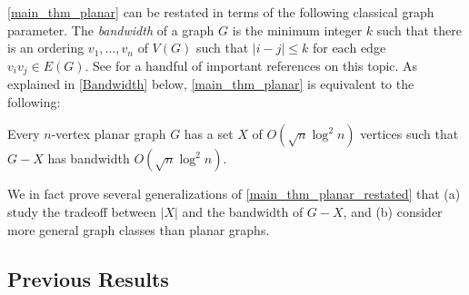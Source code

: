 \documentclass{patmorin}
\renewcommand{\leq}{\leqslant}
\newcommand{\pat}[1]{\textcolor{Blue}{Pat: #1}}
\newcommand{\gwen}[1]{\textcolor{Purple}{Gwen: #1}}
\newcommand{\defin}[1]{\emph{\textcolor{brightmaroon}{#1}}}
\begin{document}


\cref{main_thm_planar} can be restated in terms of the following classical graph parameter. The \defin{bandwidth} of a graph $G$ is the minimum integer $k$ such that there is an ordering $v_1,\dots,v_n$ of $V(G)$ such that $|i-j|\leq k$ for each edge $v_iv_j\in E(G)$. See \citep{CS89,ST20,ABET20,BPTW10,rao:small,BST09,feige:approximating} for a handful of important references on this topic. As explained in \cref{Bandwidth} below, \cref{main_thm_planar} is equivalent to the following:

\begin{thm}\label{main_thm_planar_restated}
  Every $n$-vertex planar graph $G$ has a set $X$ of $O(\sqrt{n}\log^2 n)$ vertices such that $G-X$ has bandwidth $O(\sqrt{n}\log^2 n)$.
\end{thm}

We in fact prove several generalizations of \cref{main_thm_planar_restated} that (a) study the tradeoff between $|X|$ and the bandwidth of $G-X$, and (b) consider more general graph classes than planar graphs.


\subsection{Previous Results}
\end{document}
